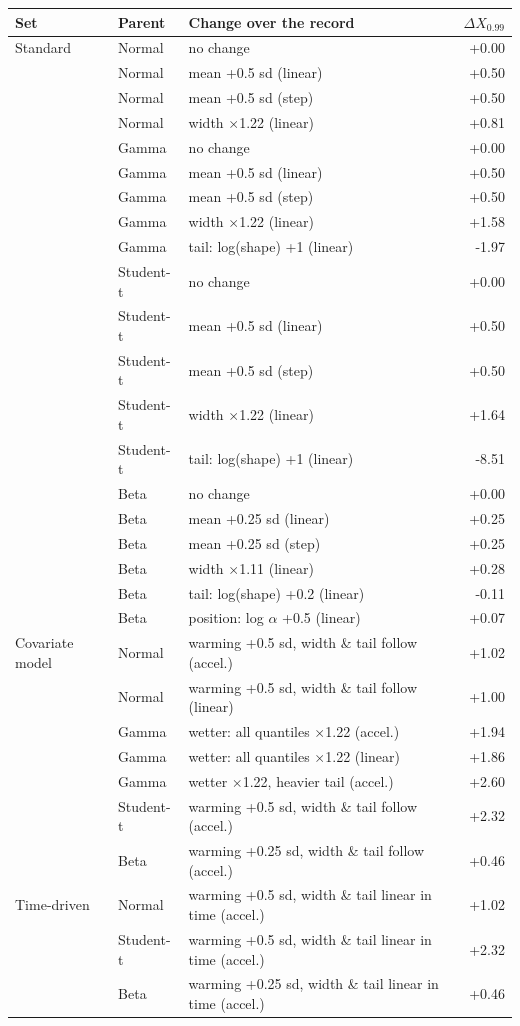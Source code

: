 \begin{tabular}{lllr}
\toprule
Set & Parent & Change over the record & $\Delta X_{0.99}$ \\
\midrule
Standard & Normal & no change & +0.00 \\
 & Normal & mean +0.5 sd (linear) & +0.50 \\
 & Normal & mean +0.5 sd (step) & +0.50 \\
 & Normal & width $\times$1.22 (linear) & +0.81 \\
 & Gamma & no change & +0.00 \\
 & Gamma & mean +0.5 sd (linear) & +0.50 \\
 & Gamma & mean +0.5 sd (step) & +0.50 \\
 & Gamma & width $\times$1.22 (linear) & +1.58 \\
 & Gamma & tail: log(shape) +1 (linear) & -1.97 \\
 & Student-t & no change & +0.00 \\
 & Student-t & mean +0.5 sd (linear) & +0.50 \\
 & Student-t & mean +0.5 sd (step) & +0.50 \\
 & Student-t & width $\times$1.22 (linear) & +1.64 \\
 & Student-t & tail: log(shape) +1 (linear) & -8.51 \\
 & Beta & no change & +0.00 \\
 & Beta & mean +0.25 sd (linear) & +0.25 \\
 & Beta & mean +0.25 sd (step) & +0.25 \\
 & Beta & width $\times$1.11 (linear) & +0.28 \\
 & Beta & tail: log(shape) +0.2 (linear) & -0.11 \\
 & Beta & position: log $\alpha$ +0.5 (linear) & +0.07 \\
\midrule
Covariate model & Normal & warming +0.5 sd, width \& tail follow (accel.) & +1.02 \\
 & Normal & warming +0.5 sd, width \& tail follow (linear) & +1.00 \\
 & Gamma & wetter: all quantiles $\times$1.22 (accel.) & +1.94 \\
 & Gamma & wetter: all quantiles $\times$1.22 (linear) & +1.86 \\
 & Gamma & wetter $\times$1.22, heavier tail (accel.) & +2.60 \\
 & Student-t & warming +0.5 sd, width \& tail follow (accel.) & +2.32 \\
 & Beta & warming +0.25 sd, width \& tail follow (accel.) & +0.46 \\
\midrule
Time-driven & Normal & warming +0.5 sd, width \& tail linear in time (accel.) & +1.02 \\
 & Student-t & warming +0.5 sd, width \& tail linear in time (accel.) & +2.32 \\
 & Beta & warming +0.25 sd, width \& tail linear in time (accel.) & +0.46 \\
\bottomrule
\end{tabular}
